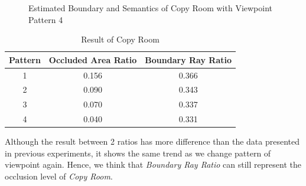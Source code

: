 \documentclass[11pt, a4paper,oneside,chapterprefix=false]{scrbook}
\begin{document}
\begin{figure}[H]
    \centering
      \label{fig:copy b 200 6} \hfill
     \label{fig:copy s 200 6}
    \caption{Estimated Boundary and Semantics of Copy Room with Viewpoint Pattern 4}
    \label{fig:copy 6}
\end{figure}

\begin{table}[H]
    \centering
    \begin{tabular}{|c|c|c|}
        \hline
        \textbf{Pattern} & \textbf{Occluded Area Ratio} & \textbf{Boundary Ray Ratio} \\
        \hline
        1 & 0.156 & 0.366 \\
        2 & 0.090 & 0.343 \\
		3 & 0.070 & 0.337 \\
		4 & 0.040 & 0.331 \\
        \hline
    \end{tabular}
    \caption{Result of Copy Room}
    \label{tab:result of copy room}
\end{table}

Although the result between 2 ratios has more difference than the data presented in previous experiments, it shows the same trend as we change pattern of viewpoint again. Hence, we think that \emph{Boundary Ray Ratio} can still represent the occlusion level of \emph{Copy Room}. 
\end{document}

